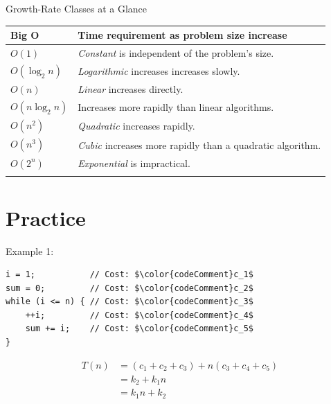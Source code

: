 \documentclass[14pt,aspectratio=1610, hyperref={pdfpagelayout=SinglePage}]{beamer}
\begin{document}
\begin{frame}{Growth-Rate Classes at a Glance}
\begin{tabularx}{1\textwidth}{l X}
  \toprule{}
    \textbf{Big O} & \textbf{Time requirement as problem size increase}\\
  \midrule{}
  \(O(1)\)        & \emph{Constant} is independent of the problem's size.\\
  \(O(\log_2n)\)  & \emph{Logarithmic} increases increases slowly.\\
  \(O(n)\)        & \emph{Linear} increases directly.\\
  \(O(n\log_2n)\) & Increases more rapidly than linear algorithms.\\
  \(O(n^2)\)      & \emph{Quadratic} increases rapidly.\\
  \(O(n^3)\)      & \emph{Cubic} increases more rapidly
                  than a quadratic algorithm.\\
  \(O(2^n)\)     & \emph{Exponential} is impractical.\\
  \bottomrule{}
\end{tabularx}
\end{frame}

\section{Practice}

\begin{frame}[fragile]{Example 1: }
\begin{lstlisting}[mathescape]
i = 1;           // Cost: $\color{codeComment}c_1$
sum = 0;         // Cost: $\color{codeComment}c_2$
while (i <= n) { // Cost: $\color{codeComment}c_3$
    ++i;         // Cost: $\color{codeComment}c_4$
    sum += i;    // Cost: $\color{codeComment}c_5$
} 
\end{lstlisting}%
\pause%
\begin{align*}%
    T(n)  &= (c_1+c_2+c_3) + n(c_3+c_4+c_5) \\
          &= k_2 +  k_1 n \\
          &= k_1 n + k_2
\end{align*}
\pause{}
\end{frame}
\end{document}
